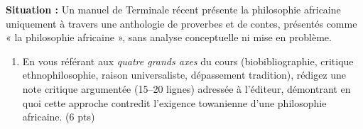 \documentclass[11pt]{article}
\begin{document}
\begin{exercice}
\textbf{Situation :} Un manuel de Terminale récent présente la philosophie africaine uniquement à travers une anthologie de proverbes et de contes, présentés comme « la philosophie africaine », sans analyse conceptuelle ni mise en problème.
\begin{enumerate}
    \item En vous référant aux \textit{quatre grands axes} du cours (biobibliographie, critique ethnophilosophie, raison universaliste, dépassement tradition), rédigez une note critique argumentée (15--20 lignes) adressée à l'éditeur, démontrant en quoi cette approche contredit l'exigence towanienne d'une philosophie africaine. (6 pts)
\end{enumerate}
\end{exercice}
\end{document}
